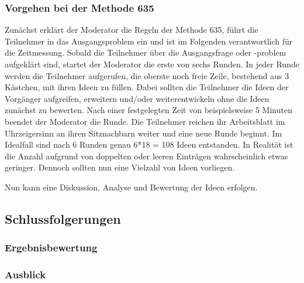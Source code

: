 \subsubsection*{Vorgehen bei der Methode 635}
Zunächst erklärt der Moderator die Regeln der Methode 635, führt die Teilnehmer in das Ausgangsproblem ein und ist im Folgenden verantwortlich für die Zeitmessung. Sobald die Teilnehmer über die Ausgangsfrage oder -problem aufgeklärt sind, startet der Moderator die erste von sechs Runden. In jeder Runde werden die Teilnehmer aufgerufen, die oberste noch freie Zeile, bestehend aus 3 Kästchen, mit ihren Ideen zu füllen. Dabei sollten die Teilnehmer die Ideen der Vorgänger aufgreifen, erweitern und/oder weiterentwickeln ohne die Ideen zunächst zu bewerten. Nach einer festgelegten Zeit von beispielsweise 5 Minuten beendet der Moderator die Runde. Die Teilnehmer reichen ihr Arbeitsblatt im Uhrzeigersinn an ihren Sitznachbarn weiter und eine neue Runde beginnt. Im Idealfall sind nach 6 Runden genau 6*18 = 108 Ideen entstanden. In Realität ist die Anzahl aufgrund von doppelten oder leeren Einträgen wahrscheinlich etwas geringer. Dennoch sollten nun eine Vielzahl von Ideen vorliegen.


Nun kann eine Diskussion, Analyse und Bewertung der Ideen erfolgen.

\newpage


\newpage


\newpage


\newpage


\newpage


\newpage


\newpage


\newpage


\subsection{Schlussfolgerungen}
\subsubsection{Ergebnisbewertung}
\subsubsection{Ausblick}